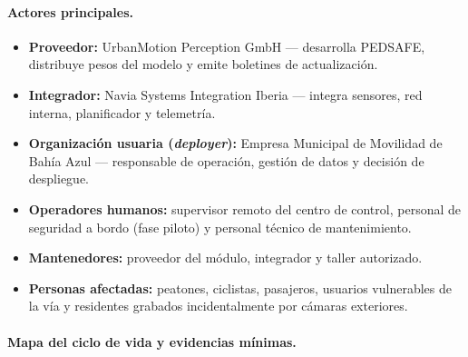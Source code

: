 \documentclass[11pt]{article}
\begin{document}
\paragraph{Actores principales.}
\begin{itemize}[nosep]
    \item \textbf{Proveedor:} UrbanMotion Perception GmbH --- desarrolla PEDSAFE, distribuye pesos del modelo y emite boletines de actualización.
    \item \textbf{Integrador:} Navia Systems Integration Iberia --- integra sensores, red interna, planificador y telemetría.
    \item \textbf{Organización usuaria (\textit{deployer}):} Empresa Municipal de Movilidad de Bahía Azul --- responsable de operación, gestión de datos y decisión de despliegue.
    \item \textbf{Operadores humanos:} supervisor remoto del centro de control, personal de seguridad a bordo (fase piloto) y personal técnico de mantenimiento.
    \item \textbf{Mantenedores:} proveedor del módulo, integrador y taller autorizado.
    \item \textbf{Personas afectadas:} peatones, ciclistas, pasajeros, usuarios vulnerables de la vía y residentes grabados incidentalmente por cámaras exteriores.
\end{itemize}

\paragraph{Mapa del ciclo de vida y evidencias mínimas.}
\end{document}
